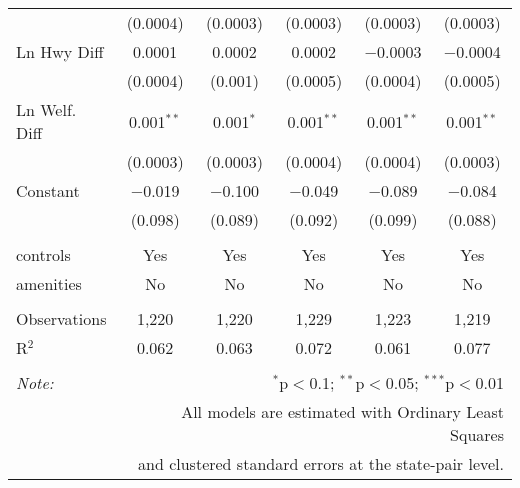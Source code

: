 \begin{table}[!htbp]
\begin{tabular}{@{\extracolsep{5pt}}lccccc}
  & (0.0004) & (0.0003) & (0.0003) & (0.0003) & (0.0003) \\ 
  Ln Hwy Diff & 0.0001 & 0.0002 & 0.0002 & $-$0.0003 & $-$0.0004 \\ 
  & (0.0004) & (0.001) & (0.0005) & (0.0004) & (0.0005) \\ 
  Ln Welf. Diff & 0.001$^{**}$ & 0.001$^{*}$ & 0.001$^{**}$ & 0.001$^{**}$ & 0.001$^{**}$ \\ 
  & (0.0003) & (0.0003) & (0.0004) & (0.0004) & (0.0003) \\ 
  Constant & $-$0.019 & $-$0.100 & $-$0.049 & $-$0.089 & $-$0.084 \\ 
  & (0.098) & (0.089) & (0.092) & (0.099) & (0.088) \\ 
 \hline \\[-1.8ex] 
controls & Yes & Yes & Yes & Yes & Yes \\ 
amenities & No & No & No & No & No \\ 
\hline \\[-1.8ex] 
Observations & 1,220 & 1,220 & 1,229 & 1,223 & 1,219 \\ 
R$^{2}$ & 0.062 & 0.063 & 0.072 & 0.061 & 0.077 \\ 
\hline 
\hline \\[-1.8ex] 
\textit{Note:}  & \multicolumn{5}{r}{$^{*}$p$<$0.1; $^{**}$p$<$0.05; $^{***}$p$<$0.01} \\ 
 & \multicolumn{5}{r}{All models are estimated with Ordinary Least Squares} \\ 
 & \multicolumn{5}{r}{and clustered standard errors at the state-pair level.} \\ 
\end{tabular} 
\end{table} 
